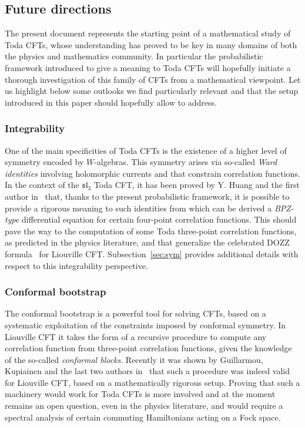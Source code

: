 \documentclass[AHL,Unicode,longabstracts,published]{cedram}
\newcommand{\frksl}{\mathfrak{sl}}
\begin{document}
\subsection{Future directions}
The present document represents the starting point of a mathematical study of Toda CFTs, whose understanding has proved to be key in many domains of both the physics and mathematics community. In particular the probabilistic framework introduced to give a meaning to Toda CFTs will hopefully initiate a thorough investigation of this family of CFTs from a mathematical viewpoint. Let us highlight below some outlooks we find particularly relevant and that the setup introduced in this paper should hopefully allow to address.

\subsubsection*{Integrability}
 One of the main specificities of Toda CFTs is the existence of a higher level of symmetry encoded by $W$-algebras. This symmetry arises via so-called \emph{Ward identities} involving holomorphic currents and that constrain correlation functions. In the context of the $\frksl_3$ Toda CFT, it has been proved by Y. Huang and the first author in~\cite{Toda_OPEWV} that, thanks to the present probabilistic framework, it is possible to provide a rigorous meaning to such identities from which can be derived a \emph{BPZ-type} differential equation for certain four-point correlation functions. This should pave the way to the computation of some Toda three-point correlation functions, as predicted in the physics literature, and that generalize the celebrated DOZZ formula~\cite{DO94,ZZ96,KRV_DOZZ} for Liouville CFT. Subsection~\ref{sec:sym} provides additional details with respect to this integrability perspective.

\subsubsection*{Conformal bootstrap} 
The conformal bootstrap is a powerful tool for solving CFTs, based on a systematic exploitation of the constraints imposed by conformal symmetry. In Liouville CFT it takes the form of a recursive procedure to compute any correlation function from three-point correlation functions, given the knowledge of the so-called \emph{conformal blocks}. Recently it was shown by Guillarmou, Kupiainen and the last two authors in~\cite{GKRV} that such a procedure was indeed valid for Liouville CFT, based on a mathematically rigorous setup. Proving that such a machinery would work for Toda CFTs is more involved and at the moment remains an open question, even in the physics literature, and would require a spectral analysis of certain commuting Hamiltonians acting on a Fock space.
\end{document}
